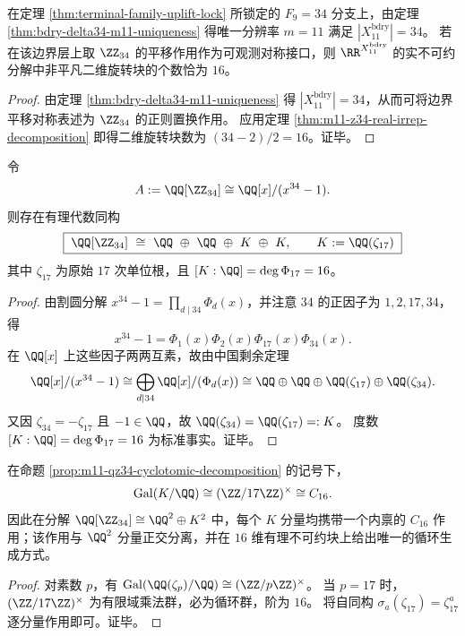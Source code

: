 \begin{corollary}\label{cor:m11-z34-sixteen-rotation-planes-from-family-lock}
在定理 \ref{thm:terminal-family-uplift-lock} 所锁定的 \(F_9=34\) 分支上，由定理 \ref{thm:bdry-delta34-m11-uniqueness} 得唯一分辨率 \(m=11\) 满足 \(|X_{11}^{\mathrm{bdry}}|=34\)。
若在该边界层上取 \(\ZZ_{34}\) 的平移作用作为可观测对称接口，则 \(\RR^{X_{11}^{\mathrm{bdry}}}\) 的实不可约分解中非平凡二维旋转块的个数恰为 \(16\)。
\end{corollary}
\begin{proof}
由定理 \ref{thm:bdry-delta34-m11-uniqueness} 得 \(|X_{11}^{\mathrm{bdry}}|=34\)，从而可将边界平移对称表述为 \(\ZZ_{34}\) 的正则置换作用。
应用定理 \ref{thm:m11-z34-real-irrep-decomposition} 即得二维旋转块数为 \((34-2)/2=16\)。证毕。
\end{proof}

\begin{proposition}\label{prop:m11-qz34-cyclotomic-decomposition}
令
\[
A:=\QQ[\ZZ_{34}]\cong \QQ[x]/(x^{34}-1).
\]
则存在有理代数同构
\begin{equation}\label{eq:m11-qz34-cyclotomic-decomposition}
\boxed{\;
\QQ[\ZZ_{34}]
\ \cong\
\QQ\ \oplus\ \QQ\ \oplus\ K\ \oplus\ K,
\qquad
K:=\QQ(\zeta_{17})\;}
\end{equation}
其中 \(\zeta_{17}\) 为原始 \(17\) 次单位根，且 \([K:\QQ]=\deg\Phi_{17}=16\)。
\end{proposition}
\begin{proof}
由割圆分解 \(x^{34}-1=\prod_{d\mid 34}\Phi_d(x)\)，并注意 \(34\) 的正因子为 \(1,2,17,34\)，得
\[
x^{34}-1=\Phi_1(x)\Phi_2(x)\Phi_{17}(x)\Phi_{34}(x).
\]
在 \(\QQ[x]\) 上这些因子两两互素，故由中国剩余定理
\[
\QQ[x]/(x^{34}-1)\cong \bigoplus_{d\mid 34}\QQ[x]/(\Phi_d(x))
\cong \QQ\oplus \QQ\oplus \QQ(\zeta_{17})\oplus \QQ(\zeta_{34}).
\]
又因 \(\zeta_{34}=-\zeta_{17}\) 且 \(-1\in\QQ\)，故 \(\QQ(\zeta_{34})=\QQ(\zeta_{17})=:K\)。
度数 \([K:\QQ]=\deg\Phi_{17}=16\) 为标准事实。证毕。
\end{proof}

\begin{corollary}\label{cor:m11-qz34-galois-c16}
\leanverified{paper\_m11\_qz34\_galois\_c16}
在命题 \ref{prop:m11-qz34-cyclotomic-decomposition} 的记号下，
\[
\mathrm{Gal}(K/\QQ)\cong (\ZZ/17\ZZ)^\times\cong C_{16}.
\]
因此在分解 \(\QQ[\ZZ_{34}]\cong \QQ^2\oplus K^2\) 中，每个 \(K\) 分量均携带一个内禀的 \(C_{16}\) 作用；该作用与 \(\QQ^2\) 分量正交分离，并在 \(16\) 维有理不可约块上给出唯一的循环生成方式。
\end{corollary}
\begin{proof}
对素数 \(p\)，有 \(\mathrm{Gal}(\QQ(\zeta_p)/\QQ)\cong (\ZZ/p\ZZ)^\times\)。
当 \(p=17\) 时，\((\ZZ/17\ZZ)^\times\) 为有限域乘法群，必为循环群，阶为 \(16\)。
将自同构 \(\sigma_a(\zeta_{17})=\zeta_{17}^a\) 逐分量作用即可。证毕。
\end{proof}

